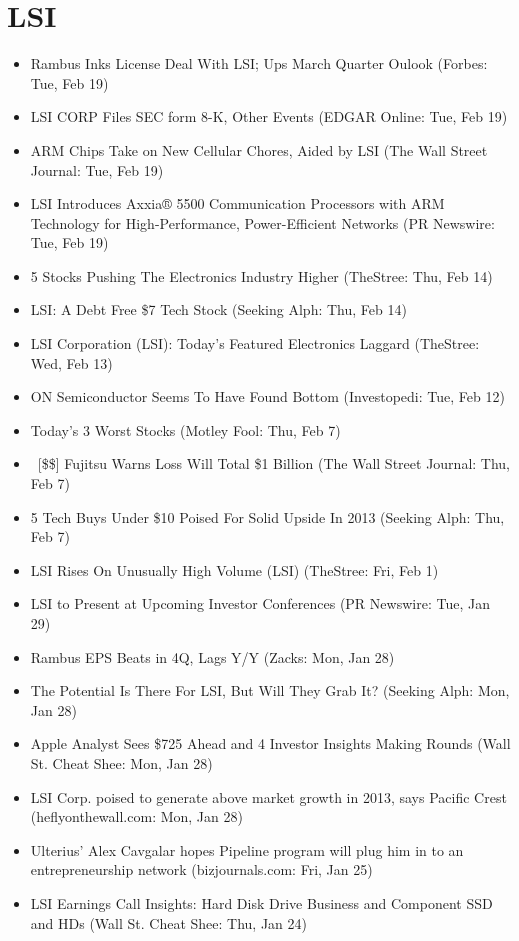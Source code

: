 \documentclass[11pt,asymmetric]{article}
\begin{document}
\section*{LSI}
\begin{itemize}
\item Rambus Inks License Deal With LSI; Ups March Quarter Oulook (Forbes: Tue, Feb 19)
\item LSI CORP Files SEC form 8-K, Other Events (EDGAR Online: Tue, Feb 19)
\item ARM Chips Take on New Cellular Chores, Aided by LSI (The Wall Street Journal: Tue, Feb 19)
\item LSI Introduces Axxia® 5500 Communication Processors with ARM Technology for High-Performance, Power-Efficient Networks (PR Newswire: Tue, Feb 19)
\item 5 Stocks Pushing The Electronics Industry Higher (TheStree: Thu, Feb 14)
\item LSI: A Debt Free \$7 Tech Stock (Seeking Alph: Thu, Feb 14)
\item LSI Corporation (LSI): Today's Featured Electronics Laggard (TheStree: Wed, Feb 13)
\item ON Semiconductor Seems To Have Found Bottom (Investopedi: Tue, Feb 12)
\item Today's 3 Worst Stocks (Motley Fool: Thu, Feb 7)
\item\ [\$\$] Fujitsu Warns Loss Will Total \$1 Billion (The Wall Street Journal: Thu, Feb 7)
\item 5 Tech Buys Under \$10 Poised For Solid Upside In 2013 (Seeking Alph: Thu, Feb 7)
\item LSI Rises On Unusually High Volume (LSI) (TheStree: Fri, Feb 1)
\item LSI to Present at Upcoming Investor Conferences (PR Newswire: Tue, Jan 29)
\item Rambus EPS Beats in 4Q, Lags Y/Y (Zacks: Mon, Jan 28)
\item The Potential Is There For LSI, But Will They Grab It? (Seeking Alph: Mon, Jan 28)
\item Apple Analyst Sees \$725 Ahead and 4 Investor Insights Making Rounds (Wall St. Cheat Shee: Mon, Jan 28)
\item LSI Corp. poised to generate above market growth in 2013, says Pacific Crest (heflyonthewall.com: Mon, Jan 28)
\item Ulterius’ Alex Cavgalar hopes Pipeline program will plug him in to an entrepreneurship network (bizjournals.com: Fri, Jan 25)
\item LSI Earnings Call Insights: Hard Disk Drive Business and Component SSD and HDs (Wall St. Cheat Shee: Thu, Jan 24)

\end{itemize}
\end{document}
